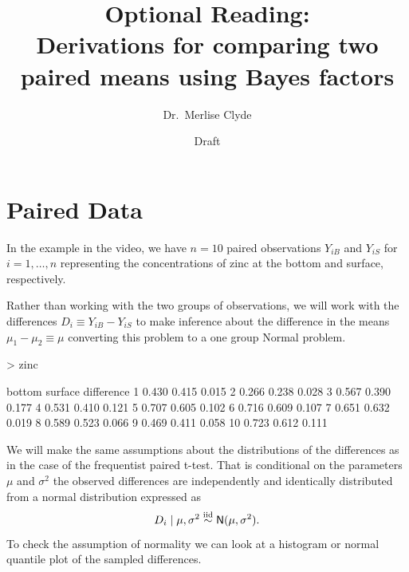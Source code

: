 \documentclass[11pt]{article}
\title{Optional Reading:\\ Derivations for comparing two paired means using Bayes factors}
\author{Dr.~Merlise Clyde}
\date{Draft}
\def\No{\textsf{N}}
\newcommand{\iid}{\ensuremath{\mathrel{\mathop{\sim}\limits^{\rm iid}}}}
\begin{document}



\maketitle








\section*{Paired Data}
In the example in the video,  we have $n = 10$ paired observations $Y_{iB}$ and $Y_{iS}$  for $i = 1, \ldots, n$ representing the concentrations of zinc at the bottom and surface, respectively.



Rather than working with the two groups of observations, we will work with the differences $D_{i} \equiv Y_{iB} - Y_{iS}$ to make inference about the difference in the means $\mu_1 - \mu_2 \equiv \mu$ converting this problem to a one group Normal problem.   

\begin{Schunk}
\begin{Sinput}
> zinc
\end{Sinput}
\begin{Soutput}
   bottom surface difference
1   0.430   0.415      0.015
2   0.266   0.238      0.028
3   0.567   0.390      0.177
4   0.531   0.410      0.121
5   0.707   0.605      0.102
6   0.716   0.609      0.107
7   0.651   0.632      0.019
8   0.589   0.523      0.066
9   0.469   0.411      0.058
10  0.723   0.612      0.111
\end{Soutput}
\end{Schunk}

We will make the same assumptions about the distributions of the differences as in the case of the frequentist paired t-test.  That is conditional on the parameters $\mu$ and $\sigma^2$
the observed differences are independently and identically distributed from a  normal distribution expressed  as
$$D_i \mid \mu, \sigma^2 \iid \No(\mu, \sigma^2).$$  To check the assumption of normality we can look at a histogram or normal quantile plot of the sampled differences. 
\end{document}

